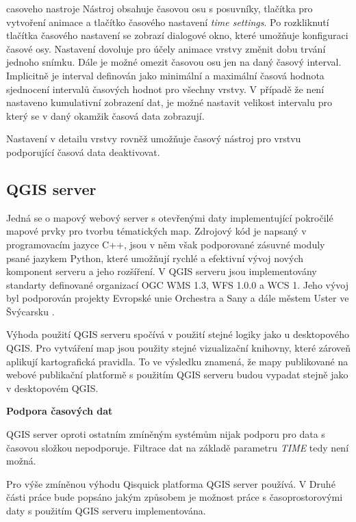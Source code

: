 casoveho nastroje Nástroj obsahuje časovou osu s posuvníky, tlačítka
pro vytvoření animace a tlačítko časového nastavení \textit{time
settings}. Po rozkliknutí tlačítka časového nastavení se zobrazí
dialogové okno, které umožňuje konfiguraci časové osy. Nastavení
dovoluje pro účely animace vrstvy změnit dobu trvání jednoho
snímku. Dále je možné omezit časovou osu jen na daný časový
interval. Implicitně je interval definován jako minimální a maximální
časová hodnota sjednocení intervalů časových hodnot pro všechny
vrstvy. V případě že není nastaveno kumulativní zobrazení dat, je
možné nastavit velikost intervalu pro který se v daný okamžik časová
data zobrazují.

Nastavení v detailu vrstvy rovněž umožňuje časový nástroj pro vrstvu
podporující časová data deaktivovat.

\newpage
\subsection{QGIS server}
\label{sssec:qgis-server}

Jedná se o mapový webový server s otevřenými daty implementující
pokročilé mapové prvky pro tvorbu tématických map. Zdrojový kód je
napsaný v programovacím jazyce C++, jsou v něm však podporované
zásuvné moduly psané jazykem Python, které umožňují rychlé a efektivní
vývoj nových komponent serveru a jeho rozšíření. V QGIS serveru jsou
implementovány standarty definované organizací OGC WMS 1.3, WFS 1.0.0
a WCS 1. Jeho vývoj byl podporován projekty Evropské unie Orchestra a
Sany a dále městem Uster ve Švýcarsku \cite{qgis-server}.

Výhoda použití QGIS serveru spočívá v použití stejné logiky jako u
desktopového QGIS. Pro vytváření map jsou použity stejné vizualizační
knihovny, které zároveň aplikují kartografická pravidla. To ve
výsledku znamená, že mapy publikované na webové publikační platformě s
použitím QGIS serveru budou vypadat stejně jako v desktopovém QGIS.

\bigskip
\noindent \textbf{Podpora časových dat}

QGIS server oproti ostatním zmíněným systémům nijak podporu pro data s
časovou složkou nepodporuje. Filtrace dat na základě parametru
\textit{TIME} tedy není možná.

Pro výše zmíněnou výhodu Qisquick platforma QGIS server používá. V
Druhé části práce bude popsáno jakým způsobem je možnost práce s
časoprostorovými daty s použitím QGIS serveru implementována.

